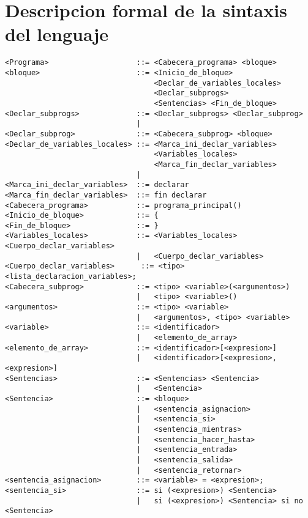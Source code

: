 \section{Descripcion formal de la sintaxis del lenguaje}

\begin{lstlisting}[breaklines=true, basicstyle=\tiny]
<Programa>                    ::= <Cabecera_programa> <bloque>
<bloque>                      ::= <Inicio_de_bloque>
                                  <Declar_de_variables_locales>
                                  <Declar_subprogs>
                                  <Sentencias> <Fin_de_bloque>
<Declar_subprogs>             ::= <Declar_subprogs> <Declar_subprog>
                              |
<Declar_subprog>              ::= <Cabecera_subprog> <bloque>
<Declar_de_variables_locales> ::= <Marca_ini_declar_variables>
                                  <Variables_locales>
                                  <Marca_fin_declar_variables>
                              |
<Marca_ini_declar_variables>  ::= declarar
<Marca_fin_declar_variables>  ::= fin declarar
<Cabecera_programa>           ::= programa_principal()
<Inicio_de_bloque>            ::= {
<Fin_de_bloque>               ::= }
<Variables_locales>           ::= <Variables_locales> <Cuerpo_declar_variables>
                              |   <Cuerpo_declar_variables>
<Cuerpo_declar_variables>      ::= <tipo> <lista_declaracion_variables>;
<Cabecera_subprog>            ::= <tipo> <variable>(<argumentos>)
                              |   <tipo> <variable>()
<argumentos>                  ::= <tipo> <variable>
                              |   <argumentos>, <tipo> <variable>
<variable>                    ::= <identificador>
                              |   <elemento_de_array>
<elemento_de_array>           ::= <identificador>[<expresion>]
                              |   <identificador>[<expresion>, <expresion>]
<Sentencias>                  ::= <Sentencias> <Sentencia>
                              |   <Sentencia>
<Sentencia>                   ::= <bloque>
                              |   <sentencia_asignacion>
                              |   <sentencia_si>
                              |   <sentencia_mientras>
                              |   <sentencia_hacer_hasta>
                              |   <sentencia_entrada>
                              |   <sentencia_salida>
                              |   <sentencia_retornar>
<sentencia_asignacion>        ::= <variable> = <expresion>;
<sentencia_si>                ::= si (<expresion>) <Sentencia>
                              |   si (<expresion>) <Sentencia> si no <Sentencia>

\end{lstlisting}
